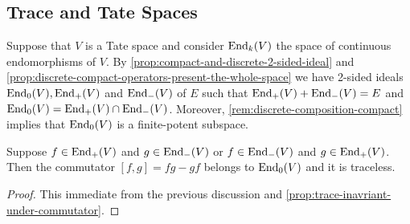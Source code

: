 \subsection*{Trace and Tate Spaces}\label{Tate-and-trace}
Suppose that $V$ is a Tate space and consider $\operatorname{End}_{k}(V)$ the space of continuous endomorphisms of $V$. By \cref{prop:compact-and-discrete-2-sided-ideal} and \cref{prop:discrete-compact-operators-present-the-whole-space} we have 2-sided ideals $\operatorname{End}_{0}(V), \operatorname{End}_{+}(V)$ and $\operatorname{End}_{-}(V)$ of $E$ such that $\operatorname{End}_{+}(V) + \operatorname{End}_{-}(V) = E$ and $\operatorname{End}_{0}(V) = \operatorname{End}_{+}(V) \cap \operatorname{End}_{-}(V)$. Moreover, \cref{rem:discrete-composition-compact} implies that $\operatorname{End}_{0}(V)$ is a finite-potent subspace.
\begin{lemma}\label{lemm:traceless-commutator}
	Suppose $f \in \operatorname{End}_{+}(V)$ and $g \in \operatorname{End}_{-}(V)$ or $f \in \operatorname{End}_{-}(V)$ and $g\in \operatorname{End}_{+}(V)$. Then the commutator $[f,g] = fg - gf$ belongs to $\operatorname{End}_{0}(V)$ and it is traceless.
\end{lemma}
\begin{proof}
	This immediate from the previous discussion and \cref{prop:trace-inavriant-under-commutator}.
\end{proof}

